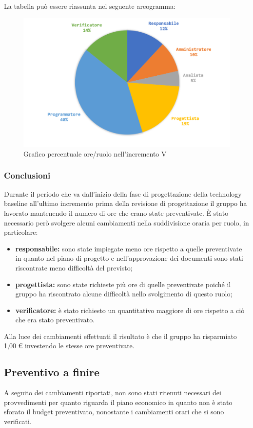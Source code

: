 			La tabella può essere riassunta nel seguente areogramma:
			\begin{figure}[H]
				\centering
				\includegraphics[width=0.8\linewidth]{images/consuntivo/ConsIncr5-2.png}
				\caption{Grafico percentuale ore/ruolo nell'incremento V}
				\label{fig:consuntivo grafico costi ruolo incremento V}
			\end{figure}

		\subsubsection*{Conclusioni}
			Durante il periodo che va dall'inizio della fase di progettazione della technology baseline all'ultimo incremento prima della revisione di progettazione il gruppo ha lavorato mantenendo il numero di ore che erano state preventivate. È stato necessario però svolgere alcuni cambiamenti nella suddivisione oraria per ruolo, in particolare:
			\begin{itemize}
				\item \textbf{responsabile:} sono state impiegate meno ore rispetto a quelle preventivate in quanto nel piano di progetto e nell'approvazione dei documenti sono stati riscontrate meno difficoltà del previsto;
				\item \textbf{progettista:} sono state richieste più ore di quelle preventivate poiché il gruppo ha riscontrato alcune difficoltà nello svolgimento di questo ruolo;
				\item \textbf{verificatore:} è stato richiesto un quantitativo maggiore di ore rispetto a ciò che era stato preventivato.
			\end{itemize}
			Alla luce dei cambiamenti effettuati il risultato è che il gruppo ha risparmiato 1,00 € investendo le stesse ore preventivate.
		

		\subsection{Preventivo a finire}
			A seguito dei cambiamenti riportati, non sono stati ritenuti necessari dei provvedimenti per quanto riguarda il piano economico in quanto non è stato sforato il budget preventivato, nonostante i cambiamenti orari che si sono verificati.
			
